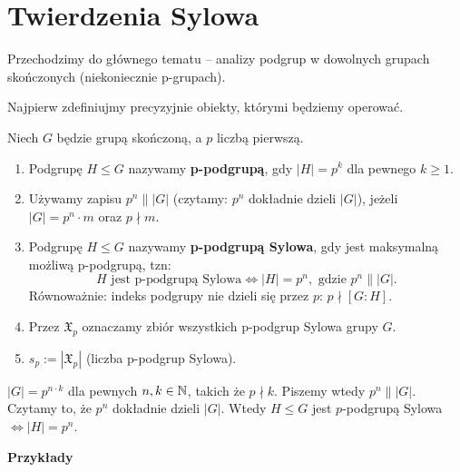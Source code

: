 \section{Twierdzenia Sylowa}

Przechodzimy do głównego tematu -- analizy podgrup w dowolnych grupach skończonych (niekoniecznie p-grupach).

Najpierw zdefiniujmy precyzyjnie obiekty, którymi będziemy operować.

\begin{definition}
    Niech $G$ będzie grupą skończoną, a $p$ liczbą pierwszą.
    \begin{enumerate}[label=\arabic*.]
        \item Podgrupę $H \le G$ nazywamy \textbf{p-podgrupą}, gdy $|H| = p^k$ dla pewnego $k \ge 1$.
        \item Używamy zapisu $p^n \parallel |G|$ (czytamy: $p^n$ dokładnie dzieli $|G|$), jeżeli $|G| = p^n \cdot m$ oraz $p \nmid m$.
        \item Podgrupę $H \le G$ nazywamy \textbf{p-podgrupą Sylowa}, gdy jest maksymalną możliwą p-podgrupą, tzn:
              \[ H \text{ jest p-podgrupą Sylowa} \iff |H| = p^n, \text{ gdzie } p^n \parallel |G|. \]
              Równoważnie: indeks podgrupy nie dzieli się przez $p$: $p \nmid [G:H]$.
        \item Przez $\mathfrak{X}_{p}$ oznaczamy zbiór wszystkich p-podgrup Sylowa grupy $G$.
        \item $s_p := |\mathfrak{X}_{p}|$ (liczba p-podgrup Sylowa).
    \end{enumerate}
\end{definition}
\begin{remark}
	$\left| G \right| = p^{n\cdot k}$ dla pewnych $n,k\in \mathbb{N}$, takich że $p\nmid k$. Piszemy wtedy $p^{n}\parallel \left| G \right| $. Czytamy to, że $p^{n}$ dokładnie dzieli $\left| G \right| $. Wtedy $H\le G$ jest $p $-podgrupą Sylowa $\iff \left| H \right| = p^{n}$.
\end{remark} 

\noindent \textbf{Przykłady}

